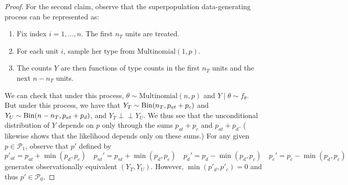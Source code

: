 \documentclass[12pt,reqno]{amsart}
\theoremstyle{theorem}
\theoremstyle{definition}
\newcommand{\indep}{\perp \!\!\! \perp}
\newcommand{\0}{\mathbf{0}}
\newcommand{\1}{\mathbf{1}}
\begin{document}
\begin{proof}
For the second claim, observe that the superpopulation data-generating process can be
    represented as: 
    \begin{enumerate}
        \item Fix index $i = 1,\ldots, n$. The first $n_T$ units are treated.
        \item For each unit $i$, sample her type from $\mathrm{Multinomial}(1, p).$
        \item The counts $Y$ are then functions of type counts in the first $n_T$ units
        and the next $n-n_T$ units. 
    \end{enumerate}
    We can check that under this process, $\theta \sim \mathrm{Multinomial}(n, p)$ and
    $Y \mid \theta \sim f_\theta$. But under this process, we have that $Y_T \sim \operatorname{Bin}
    (n_T, p_ {at} + p_c)$ and $Y_U \sim \operatorname{Bin}(n-n_T, p_{at}
    +
    p_d)$, and $Y_T \indep Y_U$. We thus see that the unconditional distribution of $Y$ depends on $p$ only through the sums $p_{at} + p_c$ and $p_{at} + p_d$. (\citet[][p. 472-3]{copas_randomization_1973} likewise shows that the likelihood depends only on these sums.) For any given $p \in \mathcal P_1$, observe that $p'$ defined by \[
        p'_{at} = p_{at} + \min(p_d, p_c) \quad p_{nt}' = p_{nt} + \min(p_d, p_c) \quad p_d' =
        p_d - \min(p_d, p_c) \quad p_{c}' = p_c - \min(p_d, p_c)
    \]
    generates observationally equivalent $(Y_T, Y_U)$. However, $\min(p'_d, p'_c) = 0$ and
    thus $p' \in \mathcal P_0$. 
\end{proof}


\prophaspower*
\end{document}
